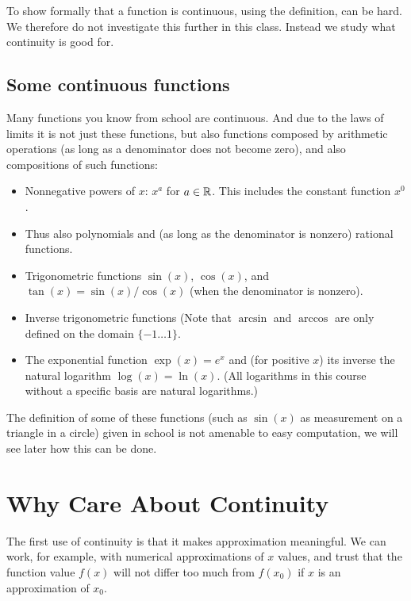 To show formally that a function is continuous, using the definition, can be
hard.  We therefore do not investigate
this further in this class. Instead
we study what continuity is good for.

\subsection{Some continuous functions}

Many functions you know from school are continuous. And due to the laws of
limits it is not just these functions, but also functions composed by
arithmetic operations (as long as a denominator does not become zero), and
also compositions of such functions:

\begin{itemize}
\item Nonnegative powers of $x$: $x^a$ for $a\in{\mathbb R}$. This includes the constant function
$x^0$.
\item Thus also polynomials and (as long as the denominator is nonzero) rational
functions.
\item Trigonometric functions $\sin(x)$, $\cos(x)$, and $\tan(x)=\sin(x)/\cos(x)$ (when
the denominator is nonzero).
\item Inverse trigonometric functions (Note that $\arcsin$ and $\arccos$ are only defined
on the domain $\{-1\ldots 1\}$.
\item The exponential function $\exp(x)=e^x$ and (for positive $x$) its
inverse the natural logarithm $\log(x)=\ln(x)$. (All logarithms in this
course without a specific basis are natural logarithms.)
\end{itemize}

The definition of some of these functions (such as $\sin(x)$ as measurement
on a triangle in a circle) given in
school is not amenable to easy computation, we will see later
 how this can be done.

\section{Why Care About Continuity}
\label{secwhycont}

The first use of continuity is that it makes approximation meaningful. We can work, for
example, with numerical approximations of $x$ values, and trust that the function value
$f(x)$ will not differ too much from $f(x_0)$ if $x$ is an approximation of $x_0$.

